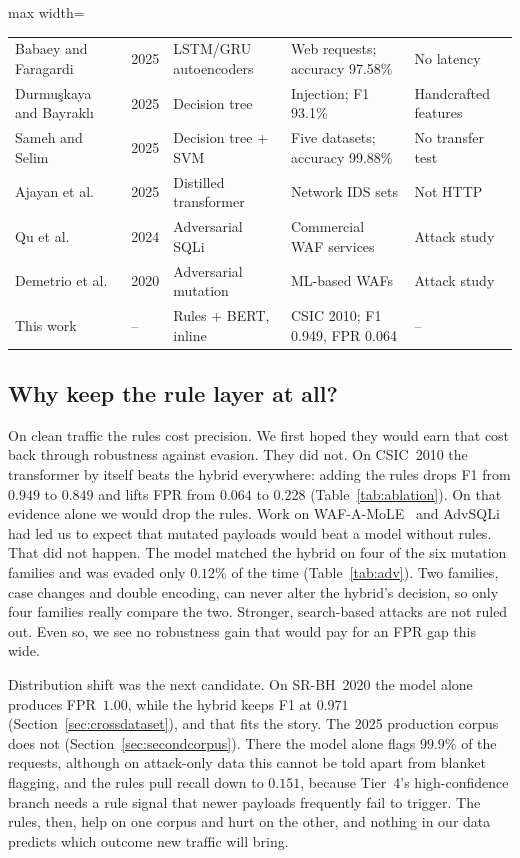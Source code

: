 \documentclass[preprint,11pt]{elsarticle}
\begin{document}
\begin{table}[t]
\begin{adjustbox}{max width=\textwidth}
\begin{tabular}{@{}p{3.4cm}p{0.8cm}p{3.4cm}p{4.6cm}p{3.0cm}@{}}
Babaey and Faragardi~\cite{zeroday2025ensemble} & 2025 & LSTM/GRU autoencoders & Web requests; accuracy 97.58\% & No latency \\
Durmu{\c{s}}kaya and Bayrakl{\i}~\cite{mlwaf2025peerj} & 2025 & Decision tree & Injection; F1 93.1\% & Handcrafted features \\
Sameh and Selim~\cite{adlwaf2025} & 2025 & Decision tree + SVM & Five datasets; accuracy 99.88\% & No transfer test \\
Ajayan et al.~\cite{distilxids2025} & 2025 & Distilled transformer & Network IDS sets & Not HTTP \\
Qu et al.~\cite{advsqli2024} & 2024 & Adversarial SQLi & Commercial WAF services & Attack study \\
Demetrio et al.~\cite{demetrio2020wafamole} & 2020 & Adversarial mutation & ML-based WAFs & Attack study \\
This work & -- & Rules + BERT, inline & CSIC 2010; F1 0.949, FPR 0.064 & -- \\
\bottomrule
\end{tabular}
\end{adjustbox}
\end{table}

\subsection{Why keep the rule layer at all?}
On clean traffic the rules cost precision. We first hoped they would earn
that cost back through robustness against evasion. They did not. On
CSIC~2010 the transformer by itself beats the hybrid everywhere: adding
the rules drops F1 from $0.949$ to $0.849$ and lifts FPR from $0.064$ to
$0.228$ (Table~\ref{tab:ablation}). On that evidence alone we would drop
the rules. Work on WAF-A-MoLE~\cite{demetrio2020wafamole} and
AdvSQLi~\cite{advsqli2024} had led us to expect that mutated payloads would
beat a model without rules. That did not happen. The model matched the
hybrid on four of the six mutation families and was evaded only $0.12\%$ of
the time (Table~\ref{tab:adv}). Two families, case changes and double
encoding, can never alter the hybrid's decision, so only four families
really compare the two. Stronger, search-based attacks are not ruled out.
Even so, we see no robustness gain that would pay for an FPR gap this wide.

Distribution shift was the next candidate. On SR-BH~2020 the model alone
produces FPR~$1.00$, while the hybrid keeps F1 at $0.971$
(Section~\ref{sec:crossdataset}), and that fits the story. The 2025
production corpus does not (Section~\ref{sec:secondcorpus}). There the
model alone flags $99.9\%$ of the requests, although on attack-only data
this cannot be told apart from blanket flagging, and the rules pull recall
down to $0.151$, because Tier~4's high-confidence branch needs a rule
signal that newer payloads frequently fail to trigger. The rules, then,
help on one corpus and hurt on the other, and nothing in our data predicts
which outcome new traffic will bring.
\end{document}
